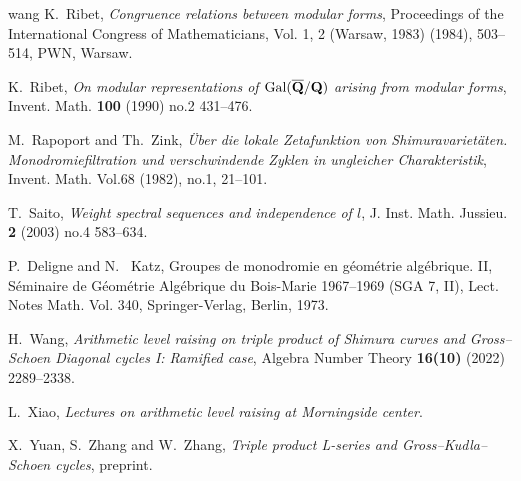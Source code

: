 \begin{thebibliography}{wang}
K.~Ribet, {\em Congruence relations between modular forms}, Proceedings of the {I}nternational {C}ongress of {M}athematicians, {V}ol. 1, 2 ({W}arsaw, 1983) (1984), 503--514, PWN, Warsaw.

K.~Ribet, {\em On modular representations of {${\rm Gal}(\overline{\bf Q}/{\bf Q})$} arising from modular forms}, Invent. Math. {\bf 100} (1990) no.2
 431--476.
 
M.~Rapoport and Th.~Zink, {\em \"{U}ber die lokale {Z}etafunktion von {S}himuravariet\"{a}ten. {M}onodromiefiltration und verschwindende {Z}yklen in
ungleicher {C}harakteristik}, Invent. Math. Vol.68  (1982), no.1, 21--101. 
 
T.~Saito, {\em Weight spectral sequences and independence of $l$}, J. Inst. Math. Jussieu. {\bf 2} (2003) no.4
583--634.

P.~Deligne and N.~ Katz, {Groupes de monodromie en g\'eom\'etrie alg\'ebrique. {II}}, {S{\'e}minaire de G{\'e}om{\'e}trie Alg{\'e}brique du Bois-Marie 1967--1969 (SGA 7, {II})}, {Lect. Notes Math. Vol. 340},  {Springer-Verlag, Berlin}, 1973.

H.~Wang, {\em Arithmetic level raising on triple product of Shimura curves and Gross--Schoen Diagonal cycles I: Ramified case}, Algebra Number Theory {\bf 16(10)} (2022) 2289--2338.

L.~Xiao, {\em Lectures on arithmetic level raising at Morningside center}.

X.~Yuan, S.~Zhang and W.~Zhang, {\em Triple product L-series and Gross--Kudla--Schoen cycles}, preprint. 
 
\end{thebibliography}
